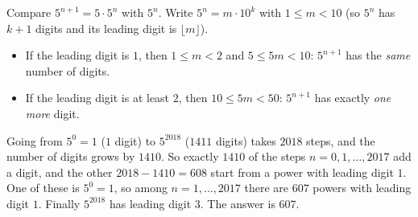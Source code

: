 Compare $5^{n+1}=5\cdot5^n$ with $5^n$. Write $5^n=m\cdot10^k$ with $1\le m<10$ (so $5^n$ has $k+1$ digits and its leading digit is $\lfloor m\rfloor$).
\begin{itemize}
\item If the leading digit is $1$, then $1\le m<2$ and $5\le5m<10$: $5^{n+1}$ has the \emph{same} number of digits.
\item If the leading digit is at least $2$, then $10\le5m<50$: $5^{n+1}$ has exactly \emph{one more} digit.
\end{itemize}
Going from $5^0=1$ ($1$ digit) to $5^{2018}$ ($1411$ digits) takes $2018$ steps, and the number of digits grows by $1410$. So exactly $1410$ of the steps $n=0,1,\dots,2017$ add a digit, and the other $2018-1410=608$ start from a power with leading digit $1$. One of these is $5^0=1$, so among $n=1,\dots,2017$ there are $607$ powers with leading digit $1$. Finally $5^{2018}$ has leading digit $3$. The answer is $\boxed{607}$.
